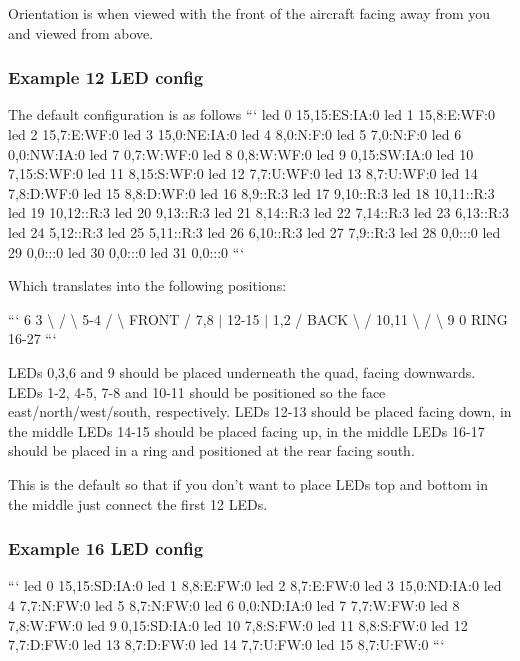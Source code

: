 Orientation is when viewed with the front of the aircraft facing away from you and viewed from above.

\subsubsection*{Example 12 L\+E\+D config}

The default configuration is as follows ``` led 0 15,15\+:E\+S\+:\+I\+A\+:0 led 1 15,8\+:E\+:\+W\+F\+:0 led 2 15,7\+:E\+:\+W\+F\+:0 led 3 15,0\+:N\+E\+:\+I\+A\+:0 led 4 8,0\+:N\+:\+F\+:0 led 5 7,0\+:N\+:\+F\+:0 led 6 0,0\+:N\+W\+:\+I\+A\+:0 led 7 0,7\+:W\+:\+W\+F\+:0 led 8 0,8\+:W\+:\+W\+F\+:0 led 9 0,15\+:S\+W\+:\+I\+A\+:0 led 10 7,15\+:S\+:\+W\+F\+:0 led 11 8,15\+:S\+:\+W\+F\+:0 led 12 7,7\+:U\+:\+W\+F\+:0 led 13 8,7\+:U\+:\+W\+F\+:0 led 14 7,8\+:D\+:\+W\+F\+:0 led 15 8,8\+:D\+:\+W\+F\+:0 led 16 8,9\+::\+R\+:3 led 17 9,10\+::\+R\+:3 led 18 10,11\+::\+R\+:3 led 19 10,12\+::\+R\+:3 led 20 9,13\+::\+R\+:3 led 21 8,14\+::\+R\+:3 led 22 7,14\+::\+R\+:3 led 23 6,13\+::\+R\+:3 led 24 5,12\+::\+R\+:3 led 25 5,11\+::\+R\+:3 led 26 6,10\+::\+R\+:3 led 27 7,9\+::\+R\+:3 led 28 0,0\+:\+:\+:0 led 29 0,0\+:\+:\+:0 led 30 0,0\+:\+:\+:0 led 31 0,0\+:\+:\+:0 ```

Which translates into the following positions\+:

``` 6 3 \textbackslash{} / \textbackslash{} 5-\/4 / \textbackslash{} F\+R\+O\+N\+T / 7,8 $\vert$ 12-\/15 $\vert$ 1,2 / B\+A\+C\+K \textbackslash{} / 10,11 \textbackslash{} / \textbackslash{} 9 0 R\+I\+N\+G 16-\/27 ```

L\+E\+Ds 0,3,6 and 9 should be placed underneath the quad, facing downwards. L\+E\+Ds 1-\/2, 4-\/5, 7-\/8 and 10-\/11 should be positioned so the face east/north/west/south, respectively. L\+E\+Ds 12-\/13 should be placed facing down, in the middle L\+E\+Ds 14-\/15 should be placed facing up, in the middle L\+E\+Ds 16-\/17 should be placed in a ring and positioned at the rear facing south.

This is the default so that if you don't want to place L\+E\+Ds top and bottom in the middle just connect the first 12 L\+E\+Ds.

\subsubsection*{Example 16 L\+E\+D config}

``` led 0 15,15\+:S\+D\+:\+I\+A\+:0 led 1 8,8\+:E\+:\+F\+W\+:0 led 2 8,7\+:E\+:\+F\+W\+:0 led 3 15,0\+:N\+D\+:\+I\+A\+:0 led 4 7,7\+:N\+:\+F\+W\+:0 led 5 8,7\+:N\+:\+F\+W\+:0 led 6 0,0\+:N\+D\+:\+I\+A\+:0 led 7 7,7\+:W\+:\+F\+W\+:0 led 8 7,8\+:W\+:\+F\+W\+:0 led 9 0,15\+:S\+D\+:\+I\+A\+:0 led 10 7,8\+:S\+:\+F\+W\+:0 led 11 8,8\+:S\+:\+F\+W\+:0 led 12 7,7\+:D\+:\+F\+W\+:0 led 13 8,7\+:D\+:\+F\+W\+:0 led 14 7,7\+:U\+:\+F\+W\+:0 led 15 8,7\+:U\+:\+F\+W\+:0 ```

